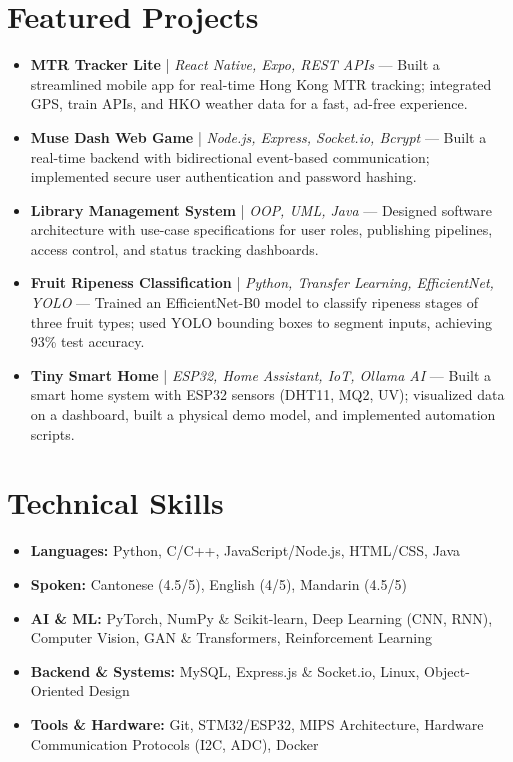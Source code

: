 \documentclass[a4paper,10pt]{article}
\begin{document}
\section{Featured Projects}
\begin{itemize}[leftmargin=*, label={}, itemsep=2pt]
    \item \textbf{MTR Tracker Lite} | \textit{React Native, Expo, REST APIs} — Built a streamlined mobile app for real-time Hong Kong MTR tracking; integrated GPS, train APIs, and HKO weather data for a fast, ad-free experience.
    \item \textbf{Muse Dash Web Game} | \textit{Node.js, Express, Socket.io, Bcrypt} — Built a real-time backend with bidirectional event-based communication; implemented secure user authentication and password hashing.
    \item \textbf{Library Management System} | \textit{OOP, UML, Java} — Designed software architecture with use-case specifications for user roles, publishing pipelines, access control, and status tracking dashboards.
    \item \textbf{Fruit Ripeness Classification} | \textit{Python, Transfer Learning, EfficientNet, YOLO} — Trained an EfficientNet-B0 model to classify ripeness stages of three fruit types; used YOLO bounding boxes to segment inputs, achieving 93\% test accuracy.
    \item \textbf{Tiny Smart Home} | \textit{ESP32, Home Assistant, IoT, Ollama AI} — Built a smart home system with ESP32 sensors (DHT11, MQ2, UV); visualized data on a dashboard, built a physical demo model, and implemented automation scripts.
\end{itemize}

\section{Technical Skills}
\begin{itemize}[leftmargin=*, label={}, itemsep=1pt]
    \item \textbf{Languages:} Python, C/C++, JavaScript/Node.js, HTML/CSS, Java
    \item \textbf{Spoken:} Cantonese (4.5/5), English (4/5), Mandarin (4.5/5)
    \item \textbf{AI \& ML:} PyTorch, NumPy \& Scikit-learn, Deep Learning (CNN, RNN), Computer Vision, GAN \& Transformers, Reinforcement Learning
    \item \textbf{Backend \& Systems:} MySQL, Express.js \& Socket.io, Linux, Object-Oriented Design
    \item \textbf{Tools \& Hardware:} Git, STM32/ESP32, MIPS Architecture, Hardware Communication Protocols (I2C, ADC), Docker
\end{itemize}
\end{document}

